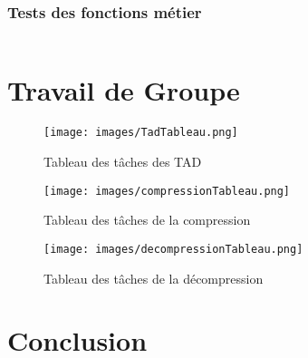 \documentclass[10pt]{report}
\begin{document}
            \subsection{Tests des fonctions métier}
                \inputminted[breaklines]{c}{../src/testsFonctionsMetier.c}
                
        \chapter{Travail de Groupe}
        \begin{figure}[h] 
   			 \centering      
    		\texttt{[image: images/TadTableau.png]}
    		\caption{Tableau des tâches des TAD}
    		\label{fig:exemple}
		\end{figure}
		\begin{figure}[h] 
   			 \centering      
    		\texttt{[image: images/compressionTableau.png]}
    		\caption{Tableau des tâches de la compression}
    		\label{fig:exemple}
		\end{figure}
		\begin{figure}[h] 
   			 \centering      
    		\texttt{[image: images/decompressionTableau.png]}
    		\caption{Tableau des tâches de la décompression}
    		\label{fig:exemple}
		\end{figure}
        \chapter{Conclusion}
\end{document}

